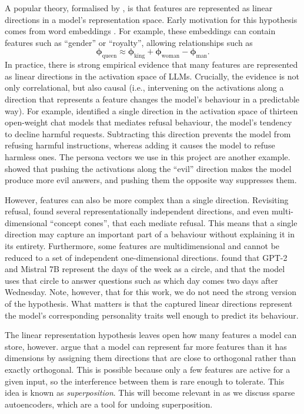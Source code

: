 A popular theory, formalised by \citet{park2024linear_rep_hypothesis}, is that features are represented as linear directions in a model's representation space. Early motivation for this hypothesis comes from word embeddings \citep{mikolov2013linguistic}. For example, these embeddings can contain features such as ``gender'' or ``royalty'', allowing relationships such as
$$
\boldsymbol{\phi}_{\text{queen}} \approx \boldsymbol{\phi}_{\text{king}} + \boldsymbol{\phi}_{\text{woman}} - \boldsymbol{\phi}_{\text{man}}.
$$
In practice, there is strong empirical evidence that many features are represented as linear directions in the activation space of LLMs. Crucially, the evidence is not only correlational, but also causal (i.e., intervening on the activations along a direction that represents a feature changes the model's behaviour in a predictable way). For example, \cite{arditi2024refusal_direction} identified a single direction in the activation space of thirteen open-weight chat models that mediates refusal behaviour, the model's tendency to decline harmful requests. Subtracting this direction prevents the model from refusing harmful instructions, whereas adding it causes the model to refuse harmless ones. The persona vectors we use in this project are another example. \cite{chen2025persona_vectors} showed that pushing the activations along the ``evil'' direction makes the model produce more evil answers, and pushing them the opposite way suppresses them.

However, features can also be more complex than a single direction. Revisiting refusal, \cite{wollschlager2025geometry_refusal} found several representationally independent directions, and even multi-dimensional ``concept cones'', that each mediate refusal. This means that a single direction may capture an important part of a behaviour without explaining it in its entirety. Furthermore, some features are multidimensional and cannot be reduced to a set of independent one-dimensional directions. \cite{engels2025multidimensional} found that GPT-2 and Mistral 7B represent the days of the week as a circle, and that the model uses that circle to answer questions such as which day comes two days after Wednesday. Note, however, that for this work, we do not need the strong version of the hypothesis. What matters is that the captured linear directions represent the model's corresponding personality traits well enough to predict its behaviour.

The linear representation hypothesis leaves open how many features a model can store, however. \citet{elhage2022toymodelssuperposition} argue that a model can represent far more features than it has dimensions by assigning them directions that are close to orthogonal rather than exactly orthogonal. This is possible because only a few features are active for a given input, so the interference between them is rare enough to tolerate. This idea is known as \emph{superposition}. This will become relevant in  as we discuss sparse autoencoders, which are a tool for undoing superposition.

